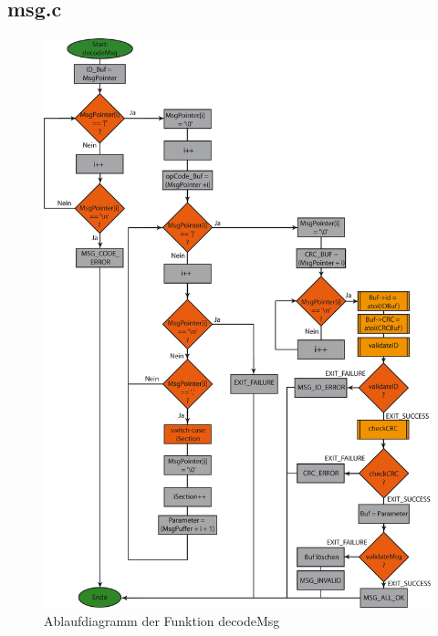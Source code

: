 \subsection{msg.c}


\begin{figure}[h]
\includegraphics[scale = 0.8]{./decodeMsg.png}
\hspace{-14pt}
\caption{Ablaufdiagramm der Funktion decodeMsg}
\end{figure} 

